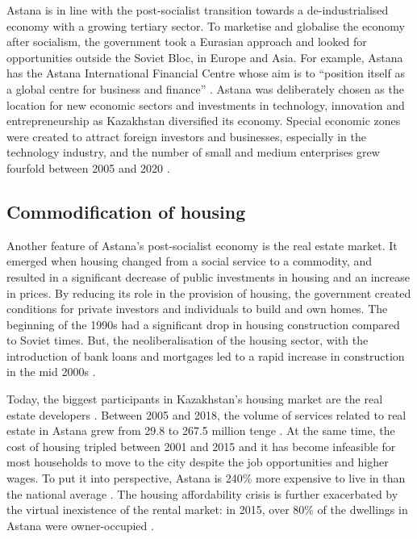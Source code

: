 \documentclass{article}
\begin{document}
Astana is in line with the post-socialist transition towards a de-industrialised economy with a growing tertiary sector. To marketise and globalise the economy after socialism, the government took a Eurasian approach and looked for opportunities outside the Soviet Bloc, in Europe and Asia. For example, Astana has the Astana International Financial Centre whose aim is to ``position itself as a global centre for business and finance'' \parencite{aifc}. Astana was deliberately chosen as the location for new economic sectors and investments in technology, innovation and entrepreneurship as Kazakhstan diversified its economy. Special economic zones were created to attract foreign investors and businesses, especially in the technology industry, and the number of small and medium enterprises grew fourfold between 2005 and 2020 \parencite{kzgovstats}.

\subsection{Commodification of housing}

Another feature of Astana's post-socialist economy is the real estate market. It emerged when housing changed from a social service to a commodity, and resulted in a significant decrease of public investments in housing and an increase in prices. 
By reducing its role in the provision of housing, the government created conditions for private investors and individuals to build and own homes. The beginning of the 1990s had a significant drop in housing construction compared to Soviet times. But, the neoliberalisation of the housing sector, with the introduction of bank loans and mortgages led to a rapid increase in construction in the mid 2000s \parencite{unece2018housing}.

Today, the biggest participants in Kazakhstan's housing market are the real estate developers \parencite{unece2018housing}. Between 2005 and 2018, the volume of services related to real estate in Astana grew from 29.8 to 267.5 million tenge \parencite{kzgovstats}.
At the same time, the cost of housing tripled between 2001 and 2015 \parencite{seitz2021urbanization} and it has become infeasible for most households to move to the city despite the job opportunities and higher wages. To put it into perspective, Astana is 240\% more expensive to live in than the national average \parencite{seitz2021urbanization}. The housing affordability crisis is further exacerbated by the virtual inexistence of the rental market: in 2015, over 80\% of the dwellings in Astana were owner-occupied \parencite{seitz2021urbanization}.
\end{document}
